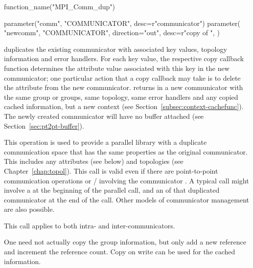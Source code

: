 %
\begin{mpi-binding}
    function_name("MPI_Comm_dup")
    
    parameter("comm", "COMMUNICATOR", desc=r"communicator")
    parameter(
        "newcomm",
        "COMMUNICATOR",
        direction="out",
        desc=r"copy of ",
    )
\end{mpi-binding}
\label{subsec:context-intracomconst:comm-dup}

 duplicates the
existing communicator  with
associated key values, topology information and error handlers.
For each key value, the respective copy callback
function determines the attribute value associated with this key in the
new communicator; one particular action that a copy callback may take
is to delete the attribute from the new communicator.
 returns in  a new
communicator with the same group or groups, same
topology, same error handlers and any copied cached information,
but a new context (see Section~\ref{subsec:context-cachefunc}).
The newly created communicator will have no buffer attached (see Section~\ref{sec:pt2pt-buffer}).


\begin{users}
This operation is used to provide a parallel library
with a duplicate
communication
space that has the same properties as the original communicator. This
includes any attributes (see below) and topologies (see
Chapter~\ref{chap:topol}). This call is valid even if there are
point-to-point communication operations
or  \MPI/  involving
the communicator
. A typical call might involve a 
at the beginning of the parallel call, and an  of
that duplicated communicator at the end of the call. Other models
of communicator management are also possible.

This call applies to both intra- and inter-communicators.
\end{users}

\begin{implementors}
One need not actually copy the group information, but only add a new reference
and increment the reference count. Copy on write can be used for the cached
information.\end{implementors}

